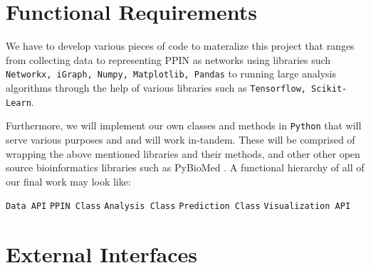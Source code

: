 
\section{Functional Requirements}

We have to develop various pieces of code to materalize this project that ranges from collecting data to representing PPIN as networks using libraries such \texttt{Networkx, iGraph, Numpy, Matplotlib, Pandas} to running large analysis algorithms through the help of various libraries such as \texttt{Tensorflow, Scikit-Learn}. 

Furthermore, we will implement our own classes and methods in \texttt{Python} that will serve various purposes and and will work in-tandem. These will be comprised of wrapping the above mentioned libraries and their methods, and other other open source bioinformatics libraries such as PyBioMed \cite{dong_pybiomed_2018}. A functional hierarchy of all of our final work may look like:
\begin{outline}
  \1 \texttt{Data API}
  \1 \texttt{PPIN Class}
  \1 \texttt{Analysis Class}
  \1 \texttt{Prediction Class}
  \1 \texttt{Visualization API}
\end{outline}





\section{External Interfaces}

